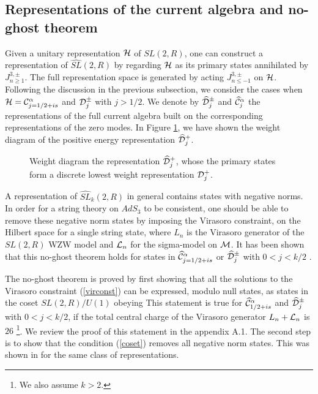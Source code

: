 \subsection{Representations of the current algebra and no-ghost theorem}

Given a unitary representation ${\cal H}$ of
$SL(2,R)$, one can construct a representation of $\widehat{SL}(2,R)$
by regarding ${\cal H}$ as its primary states annihilated
by $J_{n\geq 1}^{3,\pm}$.  The full representation space 
is generated by acting $J_{n \leq -1}^{3,\pm}$ on ${\cal H}$.
Following the discussion in the previous subsection,
we consider the cases when ${\cal H} = {\cal C}_{j=1/2 + is}^\alpha$
and ${\cal D}_j^\pm$ with $j > 1/2$. 
We denote by $\widehat {\cal D}^{\pm}_j$ and $\widehat {\cal C}^{\alpha}_j$
the representations of the full current algebra built on the 
corresponding representations  of the zero modes. 
In Figure \ref{F1},
we have shown the weight diagram of the positive energy
representation $\widehat {\cal D}^{+}_j$.



\begin{figure}[htb]
\begin{center}
\epsfxsize=3.5in\leavevmode{}
\end{center}
\caption{Weight diagram the representation  $\widehat {\cal D}^{+}_j$, 
whose the primary states form a  discrete lowest weight representation
${\cal D}_j^+$.}
\label{F1}
\end{figure} 


A representation of $\widehat{SL}_k(2,R)$ in general 
contains states with negative norms. In order for a string 
theory on $AdS_3$ to be consistent,
one should be able to remove these negative norm 
states by imposing the Virasoro constraint,
on the Hilbert space for a single string state,
where $L_n$ is the Virasoro generator of the
$SL(2,R)$ WZW model and ${\cal L}_n$ for the
sigma-model on ${\cal M}$. It has been shown that
this no-ghost theorem holds  for 
states  in $\widehat {\cal C}_{j=1/2 + i s}^{\alpha}$
or $\widehat {\cal D}_{j}^\pm$ with $0 < j < k/2$ 
\cite{Balog:1989jb,Petropoulos:1990fc,%
Hwang:1991aq,Hwang:1992an,Hwang:1998tr,Evans:1998qu,Dixon:1989cg}. 

The no-ghost theorem is proved by first showing
that all the solutions to the Virasoro constraint 
(\ref{virconst}) can be expressed, modulo null states,
as states in the coset $SL(2,R)/U(1)$ obeying
This statement is true for $\widehat{\cal C}_{1/2+is}^\alpha$ 
and $\widehat{\cal D}_j^\pm$ with $0 < j < k/2$, if the total central
charge of the Virasoro generator $L_n + {\cal L}_n$
is $26$
\cite{Balog:1989jb,Petropoulos:1990fc,Mohammedi:1990dp,%
Hwang:1991aq,Hwang:1992an,Hwang:1998tr,Evans:1998qu}
\footnote{We also assume $k > 2$.}.
We review the proof of this statement in the appendix A.1.
The second step is to show that the condition
(\ref{coset}) removes all negative norm states.
This was shown in \cite{Dixon:1989cg} for 
the same class of representations. 

